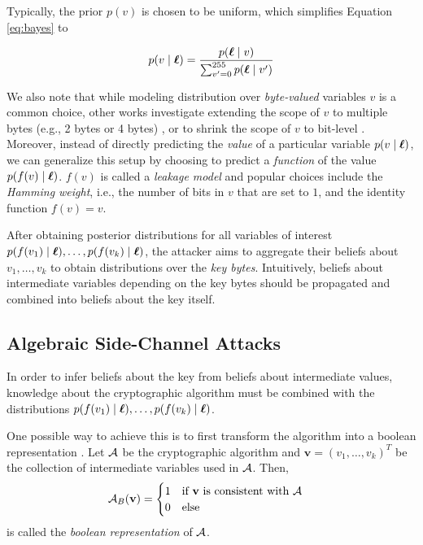 Typically, the prior $p(v)$ is chosen to be uniform, which simplifies Equation \ref{eq:bayes} to

\begin{equation}
\label{eq:bayes_simple}
    p(v \mid \boldsymbol{\ell}) = \frac{p(\boldsymbol{\ell} \mid v)}{\sum_{v'=0}^{255} p(\boldsymbol{\ell} \mid v')}
\end{equation}


We also note that while modeling distribution over \textit{byte-valued} variables $v$ is a common choice, other works investigate extending the scope of $v$ to multiple bytes (e.g., 2 bytes or 4 bytes) \cite{32bit}, or to shrink the scope of $v$ to bit-level \cite{breaking_free}.
Moreover, instead of directly predicting the \textit{value} of a particular variable $p(v \mid \boldsymbol{\ell})$, we can generalize this setup by choosing to predict a \textit{function} of the value $p(f(v) \mid \boldsymbol{\ell})$. $f(v)$ is called a \textit{leakage model} and popular choices include the \textit{Hamming weight}, i.e., the number of bits in $v$ that are set to $1$, and the identity function $f(v) = v$. 

After obtaining posterior distributions for all variables of interest $p(f(v_1) \mid \boldsymbol{\ell}), \dots, p(f(v_k) \mid \boldsymbol{\ell})$, the attacker aims to aggregate their beliefs about $v_1, \dots, v_k$ to obtain distributions over the \textit{key bytes}. Intuitively, beliefs about intermediate variables depending on the key bytes should be propagated and combined into beliefs about the key itself.

\subsection{Algebraic Side-Channel Attacks}
\label{sec:asca}
In order to infer beliefs about the key from beliefs about intermediate values, knowledge about the cryptographic algorithm must be combined with the distributions $p(f(v_1) \mid \boldsymbol{\ell}), \dots, p(f(v_k) \mid \boldsymbol{\ell})$.

One possible way to achieve this is to first transform the algorithm into a boolean representation \cite{asca}. Let $\mathcal{A}$ be the cryptographic algorithm and $\mathbf{v} = (v_1, \dots, v_k)^T$ be the collection of intermediate variables used in $\mathcal{A}$. Then, 
\begin{equation}
    \mathcal{A}_B(\mathbf{v}) = \begin{cases}
        1 \quad \text{if $\mathbf{v}$ is consistent with $\mathcal{A}$} \\
        0 \quad \text{else}
    \end{cases}
\end{equation}
is called the \textit{boolean representation} of $\mathcal{A}$. 

